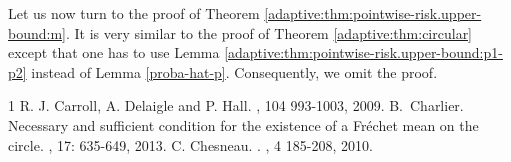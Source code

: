 \documentclass[11pt,a4paper,openany]{article}
\begin{document}
Let us now turn to the proof of Theorem \ref{adaptive:thm:pointwise-risk.upper-bound:m}.
 It is very similar to the proof of Theorem   \ref{adaptive:thm:circular} except that one has to use Lemma \ref{adaptive:thm:pointwise-risk.upper-bound:p1-p2} instead of Lemma \ref{proba-hat-p}. Consequently, we omit the proof.%
\begin{thebibliography}{1}
R. J. Carroll, A. Delaigle and P. Hall. 
,  104 993-1003, 2009.
B.~Charlier.
\newblock Necessary and sufficient condition for the existence of a Fréchet mean on the circle.
, 17: 635-649, 2013.
C. Chesneau.
.
, 4 185-208, 2010.

\end{thebibliography}
\end{document}
